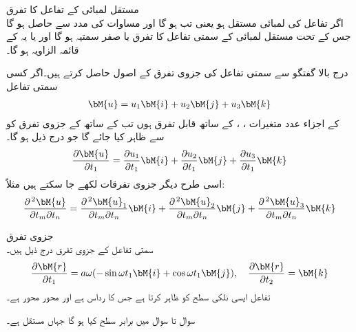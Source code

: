 \quad مستقل لمبائی کے تفاعل کا تفرق\\
اگر تفاعل  کی لمبائی مستقل ہو یعنی  تب   ہو گا اور مساوات  کی مدد سے   حاصل ہو گا جس کے تحت مستقل لمبائی کے سمتی تفاعل کا تفرق یا صفر سمتیہ  ہو گا اور یا یہ  کے قائمہ الزاویہ ہو گا۔

درج بالا گفتگو سے سمتی تفاعل کی جزوی تفرق کے اصول حاصل کرتے ہیں۔اگر کسی سمتی تفاعل 
\begin{align*}
\bM{u}=u_1\bM{i}+u_2\bM{j}+u_3\bM{k}
\end{align*}
کے اجزاء  عدد متغیرات ، ،  کے ساتھ قابل تفرق ہوں تب  کے ساتھ  کے جزوی تفرق کو
  سے ظاہر کیا جائے گا جو درج ذیل ہو گا۔
\begin{align*}
\frac{\partial \bM{u}}{\partial t_1}=\frac{\partial u_1}{\partial t_1}\bM{i}+\frac{\partial u_2}{\partial t_1}\bM{j}+\frac{\partial u_3}{\partial t_1}\bM{k}
\end{align*}
اسی طرح دیگر جزوی تفرقات لکھے جا سکتے ہیں مثلاً:
\begin{align*}
\frac{\partial^{\,2}\bM{u}}{\partial t_m \partial t_n}=\frac{\partial^{\,2} \bM{u}_1}{\partial t_m\partial t_n}\bM{i}+\frac{\partial^{\,2} \bM{u}_2}{\partial t_m\partial t_n}\bM{j}+\frac{\partial^{\,2} \bM{u}_3}{\partial t_m\partial t_n}\bM{k}
\end{align*}

\quad جزوی تفرق\\
سمتی تفاعل  کے جزوی تفرق درج ذیل ہیں۔ 
\begin{align*}
\frac{\partial \bM{r}}{\partial t_1}=a\omega (-\sin \omega t_1\bM{i}+\cos \omega t_1\bM{j}),\quad \frac{\partial \bM{r}}{\partial t_2}=\bM{k}
\end{align*}
تفاعل  ایسی نلکی سطح کو ظاہر کرتا ہے جس کا رداس  ہے  اور محور  محور ہے۔ 


سوال  تا سوال  میں برابر سطح  کیا ہو گا جہاں  مستقل ہے۔

